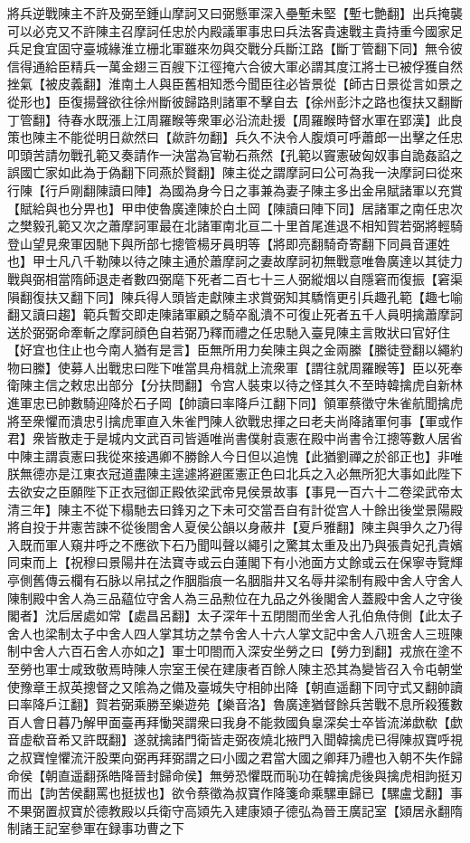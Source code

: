 將兵逆戰陳主不許及弼至鍾山摩訶又曰弼懸軍深入壘塹未堅【塹七艶翻】出兵掩襲可以必克又不許陳主召摩訶任忠於内殿議軍事忠曰兵法客貴速戰主貴持重今國家足兵足食宜固守臺城緣淮立栅北軍雖來勿與交戰分兵斷江路【斷丁管翻下同】無令彼信得通給臣精兵一萬金翅三百艘下江徑掩六合彼大軍必謂其度江將士已被俘獲自然挫氣【被皮義翻】淮南土人與臣舊相知悉今聞臣往必皆景從【師古日景從言如景之從形也】臣復揚聲欲往徐州斷彼歸路則諸軍不擊自去【徐州彭汴之路也復扶又翻斷丁管翻】待春水既漲上江周羅睺等衆軍必沿流赴援【周羅睺時督水軍在郢漢】此良策也陳主不能從明日歘然曰【歘許勿翻】兵久不決令人腹煩可呼蕭郎一出擊之任忠叩頭苦請勿戰孔範又奏請作一決當為官勒石燕然【孔範以竇憲破匈奴事自詭姦諂之誤國亡家如此為于偽翻下同燕於賢翻】陳主從之謂摩訶曰公可為我一決摩訶曰從來行陳【行戶剛翻陳讀曰陣】為國為身今日之事兼為妻子陳主多出金帛賦諸軍以充賞【賦給與也分畀也】甲申使魯廣達陳於白土岡【陳讀曰陣下同】居諸軍之南任忠次之樊毅孔範又次之蕭摩訶軍最在北諸軍南北亘二十里首尾進退不相知賀若弼將輕騎登山望見衆軍因馳下與所部七摠管楊牙員明等【將即亮翻騎奇寄翻下同員音運姓也】甲士凡八千勒陳以待之陳主通於蕭摩訶之妻故摩訶初無戰意唯魯廣達以其徒力戰與弼相當隋師退走者數四弼麾下死者二百七十三人弼縱烟以自隱窘而復振【窘渠隕翻復扶又翻下同】陳兵得人頭皆走獻陳主求賞弼知其驕惰更引兵趣孔範【趣七喻翻又讀曰趨】範兵暫交即走陳諸軍顧之騎卒亂潰不可復止死者五千人員明擒蕭摩訶送於弼弼命牽斬之摩訶顔色自若弼乃釋而禮之任忠馳入臺見陳主言敗狀曰官好住【好宜也住止也今南人猶有是言】臣無所用力矣陳主與之金兩縢【縢徒登翻以繩約物曰縢】使募人出戰忠曰陛下唯當具舟楫就上流衆軍【謂往就周羅睺等】臣以死奉衛陳主信之敕忠出部分【分扶問翻】令宫人裝束以待之怪其久不至時韓擒虎自新林進軍忠已帥數騎迎降於石子岡【帥讀曰率降戶江翻下同】領軍蔡徵守朱雀航聞擒虎將至衆懼而潰忠引擒虎軍直入朱雀門陳人欲戰忠揮之曰老夫尚降諸軍何事【軍或作君】衆皆散走于是城内文武百司皆遁唯尚書僕射袁憲在殿中尚書令江摠等數人居省中陳主謂袁憲曰我從來接遇卿不勝餘人今日但以追愧【此猶劉禪之於郤正也】非唯朕無德亦是江東衣冠道盡陳主遑遽將避匿憲正色曰北兵之入必無所犯大事如此陛下去欲安之臣願陛下正衣冠御正殿依梁武帝見侯景故事【事見一百六十二卷梁武帝太清三年】陳主不從下榻馳去曰鋒刃之下未可交當吾自有計從宫人十餘出後堂景陽殿將自投于井憲苦諫不從後閤舍人夏侯公韻以身蔽井【夏戶雅翻】陳主與爭久之乃得入既而軍人窺井呼之不應欲下石乃聞叫聲以繩引之驚其太重及出乃與張貴妃孔貴嬪同束而上【祝穆曰景陽井在法寶寺或云白蓮閣下有小池面方丈餘或云在保寧寺覽輝亭側舊傳云欄有石脉以帛拭之作胭脂痕一名胭脂井又名辱井梁制有殿中舍人守舍人陳制殿中舍人為三品藴位守舍人為三品勲位在九品之外後閣舍人蓋殿中舍人之守後閣者】沈后居處如常【處昌呂翻】太子深年十五閉閤而坐舍人孔伯魚侍側【此太子舍人也梁制太子中舍人四人掌其坊之禁令舍人十六人掌文記中舍人八班舍人三班陳制中舍人六百石舍人亦如之】軍士叩閤而入深安坐勞之曰【勞力到翻】戎旅在塗不至勞也軍士咸致敬焉時陳人宗室王侯在建康者百餘人陳主恐其為變皆召入令屯朝堂使豫章王叔英摠督之又隂為之備及臺城失守相帥出降【朝直遥翻下同守式又翻帥讀曰率降戶江翻】賀若弼乘勝至樂遊苑【樂音洛】魯廣達猶督餘兵苦戰不息所殺獲數百人會日暮乃解甲面臺再拜慟哭謂衆曰我身不能救國負辠深矣士卒皆流涕歔欷【歔音虚欷音希又許既翻】遂就擒諸門衛皆走弼夜燒北掖門入聞韓擒虎已得陳叔寶呼視之叔寶惶懼流汗股栗向弼再拜弼謂之曰小國之君當大國之卿拜乃禮也入朝不失作歸命侯【朝直遥翻孫皓降晉封歸命侯】無勞恐懼既而恥功在韓擒虎後與擒虎相訽挺刃而出【訽苦侯翻罵也挺拔也】欲令蔡徵為叔寶作降箋命乘騾車歸已【騾盧戈翻】事不果弼置叔寶於德教殿以兵衛守高熲先入建康熲子德弘為晉王廣記室【熲居永翻隋制諸王記室參軍在録事功曹之下